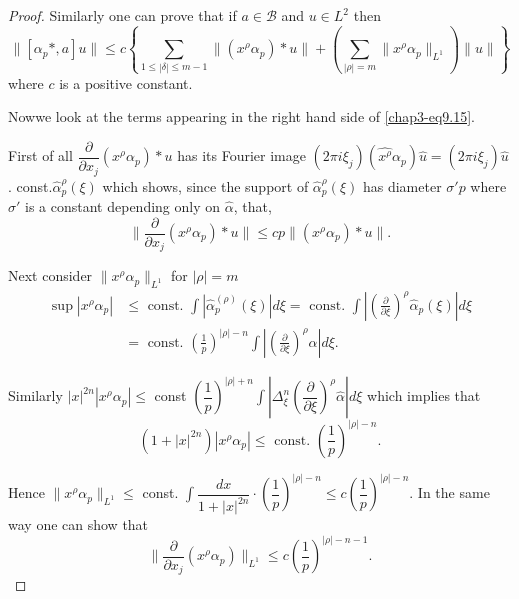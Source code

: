 \begin{proof}
 Similarly one can prove that if $a \in \mathscr{B}$ and $u \in  L^2$
 then  
\begin{equation*} 
\| [ \alpha_p *, a] u \| \le c \left\{ \sum_{1 \le |  \delta | \le
  m-1} \| (x^\rho \alpha_p )* u \| + ( \sum_{| \rho |=m} \|
x^\rho \alpha_p \|_{L^1}) \| u \| \right\}\tag{9.16} \label{chap3-eq9.16}
\end{equation*} 
where $c$ is a positive constant.
 
 Now\pageoriginale we look  at the terms appearing in the right hand
 side of \eqref{chap3-eq9.15}.  
 
 First of all $\dfrac{\partial}{\partial x_j}(x^\rho \alpha_p) * u$
 has its Fourier image $(2 \pi i \xi_j) (\hat{x^\rho} \alpha_p)
 \hat{u} = (2 \pi i \xi_j) \hat{u}$. const.${\hat{\alpha}}^{\rho}_p
 (\xi)$ which shows, since the support of ${\hat{\alpha}}^{\rho}_p
 (\xi)$ has diameter $\sigma' p$ where $\sigma'$ is a constant
 depending only on $\hat{\alpha}$, that, 
 \begin{equation}
\|  \frac{\partial}{\partial x_j}(x^\rho \alpha_p) * u \| \le c p \|
(x^\rho \alpha_p) * u \|. \tag{9.17} \label{chap3-eq9.17} 
 \end{equation} 

 Next consider $\| x^\rho \alpha_p \|_{L^1}$ for $| \rho | = m$ 
\begin{align*}
\sup \left| x^\rho \alpha_p \right| & \le \text{ const. }  \int 
|\hat{\alpha}^{(\rho )}_p (\xi)  | d \xi 
 = \text{ const. } \int | ( \frac{\partial}{\partial \xi})^\rho
 \hat{\alpha}_p (\xi)  | d \xi \\ 
& = \text{ const. }  (\frac{1}{p})^{| \rho| -n} \int  | (
\frac{\partial}{\partial \xi})^\rho \hat{\alpha}| d \xi. 
 \end{align*}

Similarly $| x |^{2n}| x^\rho \alpha_p | \le$ const
 $\left(\dfrac{1}{p}\right)^{|\rho|+n} \int \left| \Delta^n_\xi (
 \dfrac{\partial}{\partial \xi})^\rho \hat{\alpha}\right| d  \xi$
 which implies that   
 $$
 (1 + |x|^{2n}) |x^\rho \alpha_p |\le \text{ const. }
 \left(\frac{1}{p}\right)^{|\rho|-n}. 
 $$

Hence $\|x^\rho \alpha_p \|_{L^1} \le$ const. $\int \dfrac{dx}{1 + |
  x|^{2n}} \cdot \left( \dfrac{1}{p}\right)^{ | \rho | -n} \le c
\left(\dfrac{1}{p}\right)^{|\rho | -n}$. In the same way one can show that  
 $$
 \| \frac{\partial}{\partial x_j}(x^\rho \alpha_p) \|_{L^1} \le c\left(
 \frac{1}{p}\right)^{| \rho | -n -1}. 
 $$
\end{proof}

